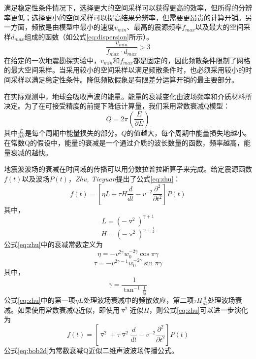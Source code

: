 \documentclass[degree=doctor]{thuthesis}
\begin{document}
满足稳定性条件情况下，选择更大的空间采样可以获得更高的效率，但所得的分辨率更低；选择更小的空间采样可以提高结果分辨率，但需要更昂贵的计算开销。另一方面，频散是由模型中最小的速度$v_{min}$、最高的震源频率$f_{max}$以及最大的空间采样$d_{max}$组成的函数（如公式\ref{eq:dispersion}所示）。
\begin{equation}
  \frac{v_{min}}{f_{max}\cdot d_{max}} > 3
  \label{eq:dispersion}
\end{equation}
在给定的一次地震勘探实验中，$v_{min}$和$f_{max}$都是固定的，因此频散条件限制了网格的最大空间采样。当采用较小的空间采样以满足频散条件时，也必须采用较小的时间采样以满足稳定性条件。降低频散假象是有限差分运算开销的最主要部分。

在实际观测中，地球会吸收声波的能量。能量的衰减变化由波场频率和介质材料所决定。为了在可接受精度的前提下降低计算量，我们采用常数衰减Q模型\cite{kjartansson1980attenuation}：
\begin{equation}
  Q = 2\pi(\frac{E}{\partial E})
\end{equation}
其中$\frac{E}{\partial E}$是每个周期中能量损失的部分。$Q$的值越大，每个周期中能量损失地越小。在常数Q的假设中，能量的衰减是一个通过介质的波长数量的函数，频率越高，能量衰减的越快。

地震波波场的衰减在时间域的传播可以用分数拉普拉斯算子来完成\cite{zhu2014modeling}。给定震源函数$f(t)$以及波场$P(t)$，\emph{Zhu, Tieyuan}提出了公式\ref{eq:zhu}：
\begin{equation}
  f(t) = \left [ \eta L+\tau H\frac{d}{dt} -v^{-2} \frac{\partial ^2}{\partial t^2}\right ]P(t)
  \label{eq:zhu}
\end{equation}
其中，
\begin{equation}
  L = (-\triangledown ^2)^{\gamma + 1}
\end{equation}
\begin{equation}
  H = (-\triangledown ^2)^{\gamma + \frac{1}{2}}
\end{equation}
公式\ref{eq:zhu}中的衰减常数定义为
\begin{equation}
  \eta = -v^{2\gamma}w_0^{-2\gamma}\cos\pi\gamma
\end{equation}
\begin{equation}
  \tau = -v^{2\gamma-1}w_0^{-2\gamma}\sin\pi\gamma
\end{equation}
其中，
\begin{equation}
  \gamma = \frac{1}{\tan^{-1}\frac{1}{Q}}
\end{equation}
公式\ref{eq:zhu}中的第一项$\eta L$处理波场衰减中的频散效应，第二项$\tau H\frac{d}{dt}$处理波场衰减。如果使用常数衰减Q近似，即使用$\triangledown ^2$近似$H$，则公式\ref{eq:zhu}可以进一步演化为
\begin{equation}
  f(t) = \left [ \triangledown ^2 +\tau \triangledown ^2\frac{d}{dt} -v^{-2} \frac{\partial ^2}{\partial t^2}\right ]P(t)
  \label{eq:bob2d}
\end{equation}
公式\ref{eq:bob2d}为常数衰减Q近似二维声波波场传播公式。
\end{document}
